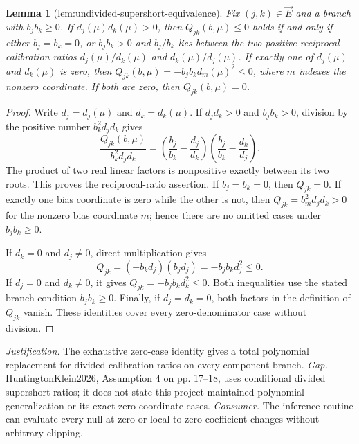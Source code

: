 \documentclass{article}
\newtheorem{lemma}{Lemma}
\begin{document}
\begin{lemma}[lem:undivided-supershort-equivalence]\label{lem:undivided-supershort-equivalence}
Fix \((j,k)\in\vec E\) and a branch with \(b_jb_k\ge0\). If \(d_j(\mu)d_k(\mu)>0\), then \(Q_{jk}(b,\mu)\le0\) holds if and only if either \(b_j=b_k=0\), or \(b_jb_k>0\) and \(b_j/b_k\) lies between the two positive reciprocal calibration ratios \(d_j(\mu)/d_k(\mu)\) and \(d_k(\mu)/d_j(\mu)\). If exactly one of \(d_j(\mu)\) and \(d_k(\mu)\) is zero, then \(Q_{jk}(b,\mu)=-b_jb_kd_m(\mu)^2\le0\), where \(m\) indexes the nonzero coordinate. If both are zero, then \(Q_{jk}(b,\mu)=0\).
\end{lemma}
\begin{proof}
Write \(d_j=d_j(\mu)\) and \(d_k=d_k(\mu)\).  If \(d_jd_k>0\) and \(b_jb_k>0\), division by the positive number \(b_k^2d_jd_k\) gives
\[
 \frac{Q_{jk}(b,\mu)}{b_k^2d_jd_k}
 =\left(\frac{b_j}{b_k}-\frac{d_j}{d_k}\right)
  \left(\frac{b_j}{b_k}-\frac{d_k}{d_j}\right).
\]
The product of two real linear factors is nonpositive exactly between its two roots.  This proves the reciprocal-ratio assertion.  If \(b_j=b_k=0\), then \(Q_{jk}=0\).  If exactly one bias coordinate is zero while the other is not, then \(Q_{jk}=b_m^2d_jd_k>0\) for the nonzero bias coordinate \(m\); hence there are no omitted cases under \(b_jb_k\ge0\).

If \(d_k=0\) and \(d_j\ne0\), direct multiplication gives
\[
 Q_{jk}=(-b_kd_j)(b_jd_j)=-b_jb_kd_j^2\le0.
\]
If \(d_j=0\) and \(d_k\ne0\), it gives \(Q_{jk}=-b_jb_kd_k^2\le0\).  Both inequalities use the stated branch condition \(b_jb_k\ge0\).  Finally, if \(d_j=d_k=0\), both factors in the definition of \(Q_{jk}\) vanish.  These identities cover every zero-denominator case without division.
\end{proof}
\par\smallskip\noindent \textit{Justification.} The exhaustive zero-case identity gives a total polynomial replacement for divided calibration ratios on every component branch. \textit{Gap.} HuntingtonKlein2026, Assumption 4 on pp. 17--18, uses conditional divided supershort ratios; it does not state this project-maintained polynomial generalization or its exact zero-coordinate cases. \textit{Consumer.} The inference routine can evaluate every null at zero or local-to-zero coefficient changes without arbitrary clipping.
\end{document}
